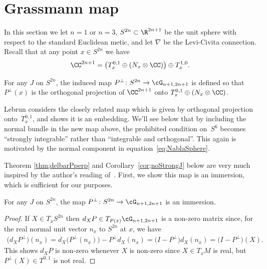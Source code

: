 \section{Grassmann map} \label{sec;Gmap}

In this section we let $n=1$ or $n=3$, $S^{2n} \subset \R^{2n+1}$ be the unit sphere with respect to the standard Euclidean metic, and let $\nabla$ be the Levi-Civita connection. Recall that at any point $x \in S^{2n}$ we have
\begin{gather*}
\CC^{2n+1} = \big( T^{0,1}_x \oplus (N_x \otimes \CC) \big) \oplus T^{1,0}_x.
\end{gather*}

\begin{defn}For any $J$ on $S^{2n}$, the induced map $P^\perp\colon S^{2n} \to \cG_{n+1,2n+1}$ is defined so that~$P^\perp(x)$ is the orthogonal projection of $\CC^{2n+1}$ onto $T^{0,1}_x \oplus (N_x \otimes \CC)$.
\end{defn}

Lebrun \cite{L} considers the closely related map which is given by orthogonal projection onto~$T^{0,1}_x$, and shows it is an embedding. We'll see below that by including the normal bundle in the new map above, the prohibited condition on~$S^6$ becomes ``strongly integrable'' rather than ``integrable and orthogonal''. This again is motivated by the normal component in equation~\eqref{eq;NablaSphere}.

Theorem \ref{thm;delbarPperp} and Corollary~\ref{cor;noStrongJ} below are very much inspired by the author's reading of~\cite{L}. First, we show this map is an immersion, which is sufficient for our purposes.

\begin{lem} For any $J$ on $S^{2n}$, the map $P^\perp\colon S^{2n} \to \cG_{n+1,2n+1}$ is an immersion.
\end{lem}

\begin{proof}If $X \in T_x S^{2n}$ then $d_X P \in T_{P(x)} \cG_{n+1,2n+1}$ is a non-zero matrix since, for the real normal unit vector $n_x$ to $S^{2n}$ at $x$, we have
\begin{gather*}
\big(d_XP^\perp\big)(n_x) = d_X\big(P^\perp(n_x)\big) - P^\perp d_X(n_x) = \big(I-P^\perp \big) d_X(n_x) = \big(I-P^\perp\big)(X).
\end{gather*}
This shows $d_X P$ is non-zero whenever $X$ is non-zero since $X \in T_xM$ is real, but $P^\perp(X) \in T^{0,1}$ is not real.
\end{proof}

